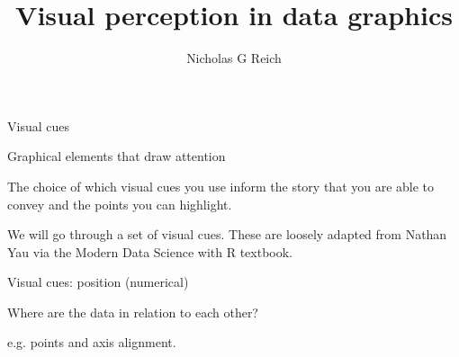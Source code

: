 \documentclass[table]{beamer}\usepackage[]{graphicx}\usepackage[]{color}
\title{Visual perception in data graphics}
\author{Nicholas G Reich}
\begin{document}
\begin{frame}[plain]
	\titlepage
\end{frame}






\begin{frame}[fragile]{Visual cues}
\begin{block}{Graphical elements that draw attention}

The choice of which visual cues you use inform the story that you are able to convey and the points you can highlight. 

\vspace{3em}

We will go through a set of visual cues. These are loosely adapted from Nathan Yau via the Modern Data Science with R textbook.

\end{block}


\end{frame}


\begin{frame}[fragile]{Visual cues: position (numerical)}

\begin{block}{Where are the data in relation to each other?}

e.g. points and axis alignment.
\end{block}

\vspace{15em}

\end{frame}
\end{document}
